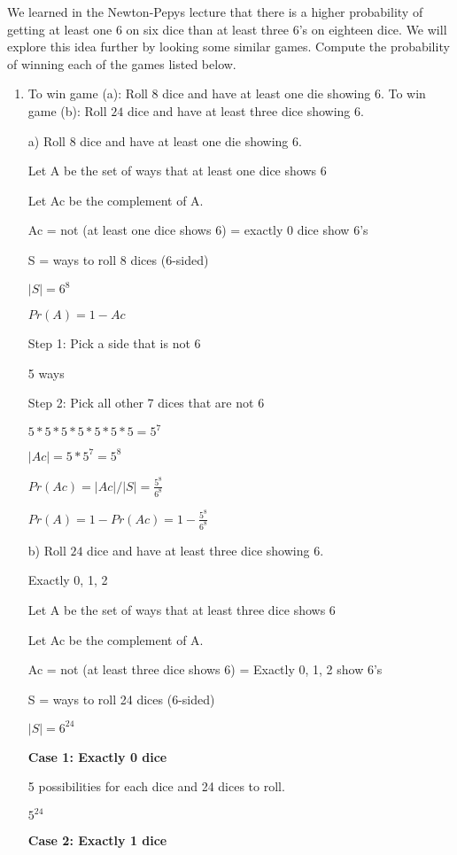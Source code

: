 \documentclass[12pt]{article}
\newcounter{ques}
\newenvironment{question}{\stepcounter{ques}{\noindent\bf Question \arabic{ques}:}}{\vspace{5mm}}
\begin{document}
\begin{question}
	We learned in the Newton-Pepys lecture that there is a higher probability of getting at least one $6$ on six dice than at least three $6$'s on eighteen dice. We will explore this idea further by looking some similar games. Compute the probability of winning each of the games listed below.
	\begin{enumerate}
		\item To win game (a): Roll $8$ dice and have at least one die showing $6$. To win game (b): Roll $24$ dice and have at least three dice showing $6$.
		
		a) Roll $8$ dice and have at least one die showing $6$.
		
		Let A be the set of ways that at least one dice shows 6

		Let Ac be the complement of A.

		Ac = not (at least one dice shows 6) = exactly 0 dice show 6's

		S = ways to roll 8 dices (6-sided)

		$|S| = 6^8$

		$Pr(A) = 1 - Ac$

		Step 1: Pick a side that is not 6

		5 ways
	
		Step 2: Pick all other 7 dices that are not 6 

		$5*5*5*5*5*5*5 = 5^7$

		$|Ac| = 5* 5^7 = 5^8$

		$Pr(Ac) = |Ac|/|S| = \frac{5^8}{6^8}$

		$Pr(A) = 1 - Pr(Ac) = 1 - \frac{5^8}{6^8}$


		b) Roll $24$ dice and have at least three dice showing $6$.
		
		Exactly 0, 1, 2

		Let A be the set of ways that at least three dice shows 6

		Let Ac be the complement of A.

		Ac = not (at least three dice shows 6) = Exactly 0, 1, 2 show 6's

		S = ways to roll 24 dices (6-sided)

		$|S| = 6^{24}$

		\textbf{Case 1: Exactly 0 dice}

		5 possibilities for each dice and 24 dices to roll. 

		$5^{24}$

		\textbf{Case 2: Exactly 1 dice}


\end{enumerate}
\end{question}
\end{document}
